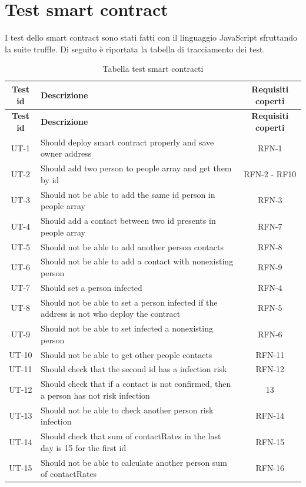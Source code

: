 \section{Test smart contract}
I test dello smart contract sono stati fatti con il linguaggio JavaScript sfruttando la suite truffle.
Di seguito è riportata la tabella di tracciamento dei test.

\renewcommand{\arraystretch}{3}
\begin{center}
	\begin{longtable}{| c | p{25em} | c |}
		\caption{Tabella test smart contracti}
		\label{tab:test-sci}\\
		\hline
		\textbf{Test id} & \centering\textbf{Descrizione} & \textbf{Requisiti coperti}\\
		\endfirsthead
		\hline
		\textbf{Test id} & \centering\textbf{Descrizione} & \textbf{Requisiti coperti}\\
		\endhead
		\endfoot
		
		\hline
		UT-1     & Should deploy smart contract properly and save owner address & RFN-1 \\
		\hline
		UT-2     & Should add two person to people array and get them by id & RFN-2 - RF10\\
		\hline
		UT-3     & Should not be able to add the same id person in people array & RFN-3 \\
		\hline
		UT-4     & Should add a contact between two id presents in people array & RFN-7 \\
		\hline
		UT-5     & Should not be able to add another person contacts & RFN-8 \\
		\hline
		UT-6     & Should not be able to add a contact with nonexisting person & RFN-9 \\
		\hline
		UT-7     & Should set a person infected & RFN-4 \\
		\hline
		UT-8     & Should not be able to set a person infected if the address is not who deploy the contract & RFN-5 \\
		\hline
		UT-9     & Should not be able to set infected a nonexisting person & RFN-6 \\
		\hline
		UT-10   & Should not be able to get other people contacts & RFN-11 \\
		\hline
		UT-11   & Should check that the second id has a infection risk & RFN-12 \\
		\hline
		UT-12   & Should check that if a contact is not confirmed, then a person has not risk infection &  13\\
		\hline
		UT-13   & Should not be able to check another person risk infection & RFN-14 \\
		\hline
		UT-14   & Should check that sum of contactRates in the last day is 15 for the first id & RFN-15 \\
		\hline
		UT-15   & Should not be able to calculate another person sum of contactRates & RFN-16 \\
		\hline
	\end{longtable}
\end{center}

